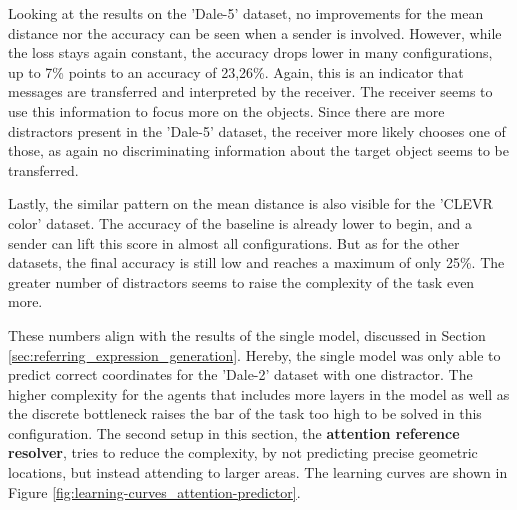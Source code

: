 Looking at the results on the 'Dale-5' dataset, no improvements for the mean distance nor the accuracy can be seen when a sender is involved.
However, while the loss stays again constant, the accuracy drops lower in many configurations, up to 7\% points to an accuracy of 23,26\%.
Again, this is an indicator that messages are transferred and interpreted by the receiver.
The receiver seems to use this information to focus more on the objects.
Since there are more distractors present in the 'Dale-5' dataset, the receiver more likely chooses one of those, as again no discriminating information about the target object seems to be transferred.

Lastly, the similar pattern on the mean distance is also visible for the 'CLEVR color' dataset.
The accuracy of the baseline is already lower to begin, and a sender can lift this score in almost all configurations.
But as for the other datasets, the final accuracy is still low and reaches a maximum of only 25\%.
The greater number of distractors seems to raise the complexity of the task even more.

These numbers align with the results of the single model, discussed in Section \ref{sec:referring_expression_generation}.
Hereby, the single model was only able to predict correct coordinates for the 'Dale-2' dataset with one distractor.
The higher complexity for the agents that includes more layers in the model as well as the discrete bottleneck raises the bar of the task too high to be solved in this configuration.
The second setup in this section, the \textbf{attention reference resolver}, tries to reduce the complexity, by not predicting precise geometric locations, but instead attending to larger areas.
The learning curves are shown in Figure \ref{fig:learning-curves_attention-predictor}.

